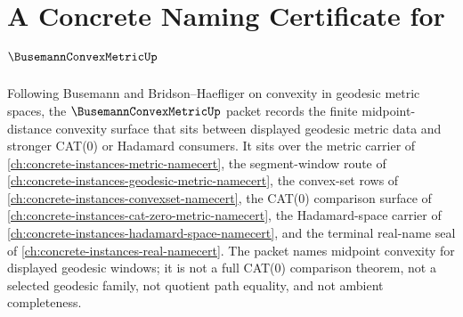 \chapter{A Concrete Naming Certificate for $\BusemannConvexMetricUp$}
\label{ch:concrete-instances-busemann-convex-metric-namecert}

Following Busemann and Bridson--Haefliger on convexity in geodesic metric spaces, the $\BusemannConvexMetricUp$ packet records the finite midpoint-distance convexity surface that sits between displayed geodesic metric data and stronger CAT(0) or Hadamard consumers. It sits over the metric carrier of \autoref{ch:concrete-instances-metric-namecert}, the segment-window route of \autoref{ch:concrete-instances-geodesic-metric-namecert}, the convex-set rows of \autoref{ch:concrete-instances-convexset-namecert}, the CAT(0) comparison surface of \autoref{ch:concrete-instances-cat-zero-metric-namecert}, the Hadamard-space carrier of \autoref{ch:concrete-instances-hadamard-space-namecert}, and the terminal real-name seal of \autoref{ch:concrete-instances-real-namecert}. The packet names midpoint convexity for displayed geodesic windows; it is not a full CAT(0) comparison theorem, not a selected geodesic family, not quotient path equality, and not ambient completeness.


